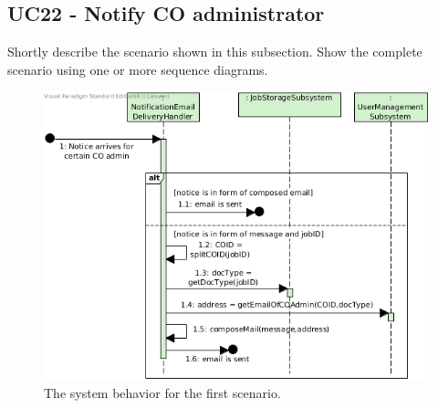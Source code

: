\subsection{UC22 - Notify CO administrator}
Shortly describe the scenario shown in this subsection.
Show the complete scenario using one or more sequence diagrams.

\begin{figure}[!htp]
    \centering
    \includegraphics[width=\textwidth]{figures/UC22 - Notify CO administrator.png}
    \caption{The system behavior for the first scenario.
        }\label{fig:seq_uc22}
\end{figure}